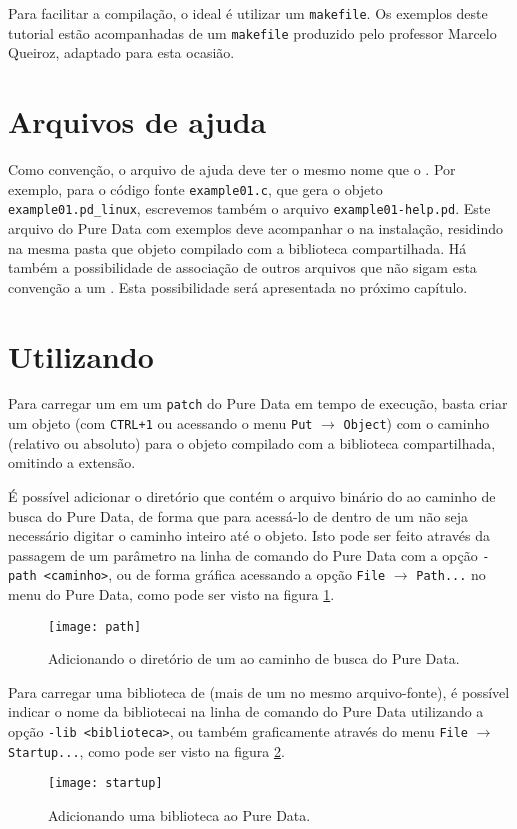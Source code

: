 Para facilitar a compilação, o ideal é utilizar um \texttt{makefile}. Os
exemplos deste tutorial estão acompanhadas de um \texttt{makefile} produzido
pelo professor Marcelo Queiroz, adaptado para esta ocasião.

\section{Arquivos de ajuda}

Como convenção, o arquivo de ajuda deve ter o mesmo nome que o \external. Por
exemplo, para o código fonte \texttt{example01.c}, que gera o objeto
\texttt{example01.pd\_linux}, escrevemos também o arquivo
\texttt{example01-help.pd}. Este arquivo do Pure Data com exemplos deve
acompanhar o \external na instalação, residindo na mesma pasta que objeto
compilado com a biblioteca compartilhada.  Há também a possibilidade de
associação de outros arquivos que não sigam esta convenção a um \external.
Esta possibilidade será apresentada no próximo capítulo.

\section{Utilizando \externals}

Para carregar um \external em um \texttt{patch} do Pure Data em tempo de
execução, basta criar um objeto (com \texttt{CTRL+1} ou acessando o menu
\texttt{Put} $\rightarrow$ \texttt{Object}) com o caminho (relativo ou
absoluto) para o objeto compilado com a biblioteca compartilhada, omitindo a
extensão.

É possível adicionar o diretório que contém o arquivo binário do \external ao
caminho de busca do Pure Data, de forma que para acessá-lo de dentro de um
\patch não seja necessário digitar o caminho inteiro até o objeto. Isto pode
ser feito através da passagem de um parâmetro na linha de comando do Pure Data
com a opção \texttt{-path <caminho>}, ou de forma gráfica acessando a opção
\texttt{File} $\rightarrow$ \texttt{Path...} no menu do Pure Data,
como pode ser visto na figura \ref{fig:search-path}.

\begin{figure}[h!]
  \centering
  \texttt{[image: path]}
  \caption{Adicionando o diretório de um \external ao caminho de busca do Pure Data.}
  \label{fig:search-path}
\end{figure}

Para carregar uma biblioteca de \externals (mais de um \external no mesmo
arquivo-fonte), é possível indicar o nome da bibliotecai na linha
de comando do Pure Data utilizando a opção \texttt{-lib <biblioteca>}, ou
também graficamente através do menu \texttt{File} $\rightarrow$
\texttt{Startup...}, como pode ser visto na figura \ref{fig:lib}.

\begin{figure}[h!]
  \centering
  \texttt{[image: startup]}
  \caption{Adicionando uma biblioteca ao Pure Data.}
  \label{fig:lib}
\end{figure}

